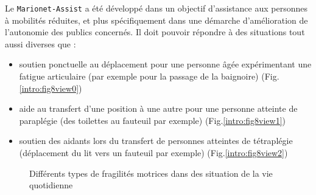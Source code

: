 Le {\tt Marionet-Assist} a été développé dans un objectif d'assistance aux personnes à mobilités réduites, et plus spécifiquement dans une démarche d'amélioration de l'autonomie des publics concernés. Il doit pouvoir répondre à des situations tout aussi diverses que :
\begin{itemize}
 \item soutien ponctuelle au déplacement pour une personne âgée expérimentant une fatigue articulaire (par exemple pour la passage de la baignoire) (Fig.\ref{intro:fig8view0})
 \item aide au transfert d'une position à une autre pour une personne atteinte de paraplégie (des toilettes au fauteuil par exemple) (Fig.\ref{intro:fig8view1})
 \item soutien des aidants lors du transfert de personnes atteintes de tétraplégie (déplacement du lit vers un fauteuil par exemple) (Fig.\ref{intro:fig8view2})
\end{itemize}

\begin{figure}[htp]
  \centering
   \hfill
   \hfill
   \hfill
    \caption{\footnotesize{Différents types de fragilités motrices dans des situation de la vie quotidienne}}
\label{intro:fig8}
\end{figure}

